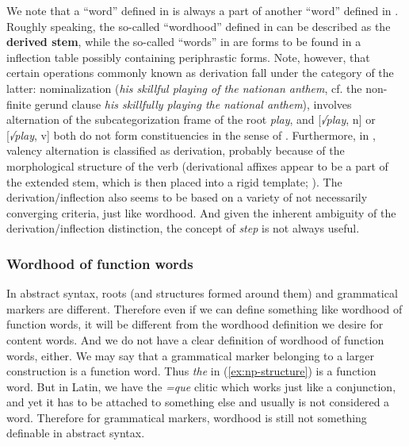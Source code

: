 \documentclass[a4paper, oneside, scheme=plain, 12pt]{article}
\newcommand*{\concept}[1]{\textbf{#1}}
\newcommand*{\term}[1]{\emph{#1}}
\newcommand{\form}[1]{\emph{#1}}
\begin{document}
We note that a ``word'' defined in 
is always a part of another ``word'' defined in .
Roughly speaking, the so-called ``wordhood'' defined in 
can be described as the \concept{derived stem},
while the so-called ``words'' in 
are forms to be found in a inflection table possibly containing periphrastic forms.
Note, however, that certain operations commonly known as derivation
fall under the category of the latter:
nominalization (\form{his skillful playing of the nationan anthem},
cf. the non-finite gerund clause \form{his skillfully playing the national anthem}),
involves alternation of the subcategorization frame of the root \form{play},
and [\form{√play}, n] or [\form{√play}, v] both do not form constituencies
in the sense of .
Furthermore, in \citet{jacques2021grammar}, valency alternation is classified as derivation,
probably because of the morphological structure of the verb
(derivational affixes appear to be a part of the extended stem,
which is then placed into a rigid template; ).
The derivation/inflection also seems to be based on a variety of 
not necessarily converging criteria, just like wordhood.
And given the inherent ambiguity of the derivation/inflection distinction,
the concept of \term{step} is not always useful.

\subsubsection{Wordhood of function words}\label{sec:no-function-word-in-syntax}

In abstract syntax, roots (and structures formed around them) and grammatical markers are different.
Therefore even if we can define something like wordhood of function words,
it will be different from the wordhood definition we desire for content words.
And we do not have a clear definition of wordhood of function words, either.
We may say that a grammatical marker belonging to a larger construction is a function word.
Thus \form{the} in (\ref{ex:np-structure}) is a function word.
But in Latin, we have the \form{=que} clitic which works just like a conjunction,
and yet it has to be attached to something else and usually is not considered a word.
Therefore for grammatical markers, wordhood is still not something definable in abstract syntax.
\end{document}
